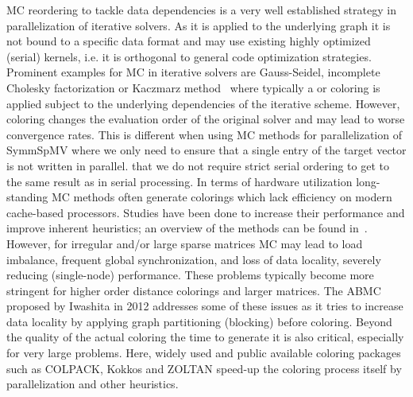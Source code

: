 
\Acrfull{MC} reordering to tackle data dependencies is a very well established strategy in parallelization of iterative solvers. As it is applied to the underlying graph it is not bound to a specific data format and may use existing highly optimized (serial) kernels, i.e. it is orthogonal to general code optimization strategies.  
Prominent examples for  \acrshort{MC} in iterative solvers are Gauss-Seidel, incomplete 
Cholesky factorization or Kaczmarz method~\cite{RBGS,MC,feast_mc} where typically a \DONE or \DTWO coloring is applied subject to the underlying dependencies of the iterative scheme. However, coloring changes the evaluation order of the original solver and may lead to worse convergence rates. This is different when using  \acrshort{MC} methods for parallelization of \acrshort{SymmSpMV} where we only need to ensure that a single entry of the target vector is not written in parallel.  that we do not  require strict serial ordering to get to the same result as in serial processing.
In terms of hardware utilization long-standing \acrshort{MC} methods often generate colorings which lack efficiency on modern cache-based
processors. Studies have been done to increase their
performance and improve inherent heuristics; an overview of the methods can be found in~\cite{gebremedhin2000scalable,dist_k_def,COLPACK,equitable_color}. However, 
for irregular and/or large sparse 
matrices \acrshort{MC} may lead to load imbalance, frequent global synchronization, 
and loss of data locality, severely reducing (single-node) performance. 
These problems typically become more stringent for higher order distance
colorings and larger matrices.
The \acrfull{ABMC}~\cite{ABMC} proposed by Iwashita \etal in 2012 addresses some of these issues as it tries to increase data locality by applying graph partitioning (blocking) before coloring. 
Beyond the quality of the actual coloring the time to generate it is also critical, especially for very large problems. Here, widely used and public available coloring packages such as COLPACK\cite{COLPACK}, Kokkos\cite{kokkos} and ZOLTAN\cite{BOZDAG2008515,doi:10.1137/080732158} speed-up the coloring process itself by parallelization and other heuristics. 

